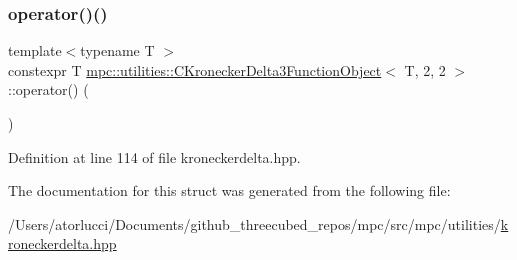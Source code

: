 \subsubsection{\texorpdfstring{operator()()}{operator()()}}
{\footnotesize\ttfamily template$<$typename T $>$ \\
constexpr T \mbox{\hyperlink{structmpc_1_1utilities_1_1_c_kronecker_delta3_function_object}{mpc\+::utilities\+::\+C\+Kronecker\+Delta3\+Function\+Object}}$<$ T, 2, 2 $>$\+::operator() (\begin{DoxyParamCaption}{ }\end{DoxyParamCaption})\hspace{0.3cm}{\ttfamily [inline]}}



Definition at line 114 of file kroneckerdelta.\+hpp.



The documentation for this struct was generated from the following file\+:\begin{DoxyCompactItemize}
\item 
/\+Users/atorlucci/\+Documents/github\+\_\+threecubed\+\_\+repos/mpc/src/mpc/utilities/\mbox{\hyperlink{kroneckerdelta_8hpp}{kroneckerdelta.\+hpp}}\end{DoxyCompactItemize}
